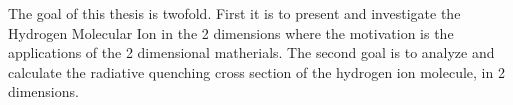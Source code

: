 
The goal of this thesis is twofold. First it is to present and investigate the Hydrogen Molecular Ion in the 2 dimensions where the motivation is the applications of the 2 dimensional matherials.
The second goal is to analyze and calculate the radiative quenching cross section of the hydrogen ion molecule, in 2 dimensions.
